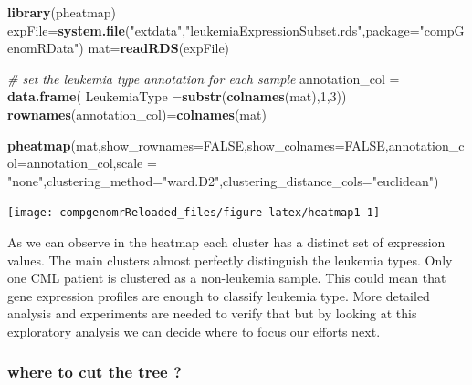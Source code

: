 \documentclass[12pt,]{krantz}
\newenvironment{Shaded}{\begin{snugshade}}{\end{snugshade}}
\newcommand{\CommentTok}[1]{\textcolor[rgb]{0.56,0.35,0.01}{\textit{#1}}}
\newcommand{\DataTypeTok}[1]{\textcolor[rgb]{0.13,0.29,0.53}{#1}}
\newcommand{\DecValTok}[1]{\textcolor[rgb]{0.00,0.00,0.81}{#1}}
\newcommand{\KeywordTok}[1]{\textcolor[rgb]{0.13,0.29,0.53}{\textbf{#1}}}
\newcommand{\NormalTok}[1]{#1}
\newcommand{\OtherTok}[1]{\textcolor[rgb]{0.56,0.35,0.01}{#1}}
\newcommand{\StringTok}[1]{\textcolor[rgb]{0.31,0.60,0.02}{#1}}
\theoremstyle{definition}
\theoremstyle{definition}
\theoremstyle{definition}
\theoremstyle{remark}
\begin{document}
\begin{Shaded}
\begin{Highlighting}[]
\KeywordTok{library}\NormalTok{(pheatmap)}
\NormalTok{expFile=}\KeywordTok{system.file}\NormalTok{(}\StringTok{"extdata"}\NormalTok{,}\StringTok{"leukemiaExpressionSubset.rds"}\NormalTok{,}\DataTypeTok{package=}\StringTok{"compGenomRData"}\NormalTok{)}
\NormalTok{mat=}\KeywordTok{readRDS}\NormalTok{(expFile)}

\CommentTok{# set the leukemia type annotation for each sample}
\NormalTok{annotation_col =}\StringTok{ }\KeywordTok{data.frame}\NormalTok{(}
                    \DataTypeTok{LeukemiaType =}\KeywordTok{substr}\NormalTok{(}\KeywordTok{colnames}\NormalTok{(mat),}\DecValTok{1}\NormalTok{,}\DecValTok{3}\NormalTok{))}
\KeywordTok{rownames}\NormalTok{(annotation_col)=}\KeywordTok{colnames}\NormalTok{(mat)}
  

\KeywordTok{pheatmap}\NormalTok{(mat,}\DataTypeTok{show_rownames=}\OtherTok{FALSE}\NormalTok{,}\DataTypeTok{show_colnames=}\OtherTok{FALSE}\NormalTok{,}\DataTypeTok{annotation_col=}\NormalTok{annotation_col,}\DataTypeTok{scale =} \StringTok{"none"}\NormalTok{,}\DataTypeTok{clustering_method=}\StringTok{"ward.D2"}\NormalTok{,}\DataTypeTok{clustering_distance_cols=}\StringTok{"euclidean"}\NormalTok{)}
\end{Highlighting}
\end{Shaded}

\begin{center}\texttt{[image: compgenomrReloaded\_files/figure-latex/heatmap1-1]} \end{center}

As we can observe in the heatmap each cluster has a distinct set of
expression values. The main clusters almost perfectly distinguish the
leukemia types. Only one CML patient is clustered as a non-leukemia
sample. This could mean that gene expression profiles are enough to
classify leukemia type. More detailed analysis and experiments are
needed to verify that but by looking at this exploratory analysis we can
decide where to focus our efforts next.

\hypertarget{where-to-cut-the-tree}{%
\subsubsection{where to cut the tree ?}\label{where-to-cut-the-tree}}
\end{document}
